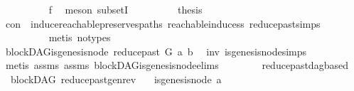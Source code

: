 \begin{isabellebody}
\ \ \ \ \ \ \ \ \isamarkupfalse%
\ f{}\ \isamarkupfalse%
\ {\isacharparenleft}{\kern0pt}meson\ subsetI{\isacharparenright}{\kern0pt}\isanewline
\ \ \ \ \ \ \isamarkupfalse%
\ \isamarkupfalse%
\ {\isacharquery}{\kern0pt}thesis\isanewline
\ \ \ \ \ \ \ \ \isamarkupfalse%
\ con\ \ induce{\isacharunderscore}{\kern0pt}reachable{\isacharunderscore}{\kern0pt}preserves{\isacharunderscore}{\kern0pt}paths\ reachable{\isacharunderscore}{\kern0pt}induce{\isacharunderscore}{\kern0pt}ss\ reduce{\isacharunderscore}{\kern0pt}past{\isachardot}{\kern0pt}simps\isanewline
\ \ \ \ \ \ \ \ \isamarkupfalse%
\ {\isacharparenleft}{\kern0pt}metis\ {\isacharparenleft}{\kern0pt}no{\isacharunderscore}{\kern0pt}types{\isacharparenright}{\kern0pt}{\isacharparenright}{\kern0pt}\isanewline
\ \ \ \ \isamarkupfalse%
\isanewline
\ \ \isamarkupfalse%
\isanewline
\ \ \isamarkupfalse%
\ \isamarkupfalse%
\ {\isachardoublequoteopen}blockDAG{\isachardot}{\kern0pt}is{\isacharunderscore}{\kern0pt}genesis{\isacharunderscore}{\kern0pt}node\ {\isacharparenleft}{\kern0pt}reduce{\isacharunderscore}{\kern0pt}past\ G\ a{\isacharparenright}{\kern0pt}\ b{\isachardoublequoteclose}\ \isamarkupfalse%
\ inv\ is{\isacharunderscore}{\kern0pt}genesis{\isacharunderscore}{\kern0pt}node{\isachardot}{\kern0pt}simps\isanewline
\ \ \ \ \isamarkupfalse%
\ {\isacharparenleft}{\kern0pt}metis\ assms{\isacharparenleft}{\kern0pt}{}{\isacharparenright}{\kern0pt}\ assms{\isacharparenleft}{\kern0pt}{}{\isacharparenright}{\kern0pt}\ blockDAG{\isachardot}{\kern0pt}is{\isacharunderscore}{\kern0pt}genesis{\isacharunderscore}{\kern0pt}node{\isachardot}{\kern0pt}elims{\isacharparenleft}{\kern0pt}{}{\isacharparenright}{\kern0pt}\isanewline
\ \ \ \ \ \ \ \ reduce{\isacharunderscore}{\kern0pt}past{\isacharunderscore}{\kern0pt}dagbased{\isacharparenright}{\kern0pt}\ \isanewline
{}\isamarkupfalse%
%
\endisatagproof
{\isafoldproof}%
%
\isadelimproof
\isanewline
%
\endisadelimproof
\isanewline
\isanewline
\isanewline
{}\isamarkupfalse%
\ {\isacharparenleft}{\kern0pt}\ blockDAG{\isacharparenright}{\kern0pt}\ reduce{\isacharunderscore}{\kern0pt}past{\isacharunderscore}{\kern0pt}gen{\isacharunderscore}{\kern0pt}rev{\isacharcolon}{\kern0pt}\isanewline
\ \ \ {\isachardoublequoteopen}{\isasymnot}is{\isacharunderscore}{\kern0pt}genesis{\isacharunderscore}{\kern0pt}node\ a{\isachardoublequoteclose}\ \isanewline

\end{isabellebody}
